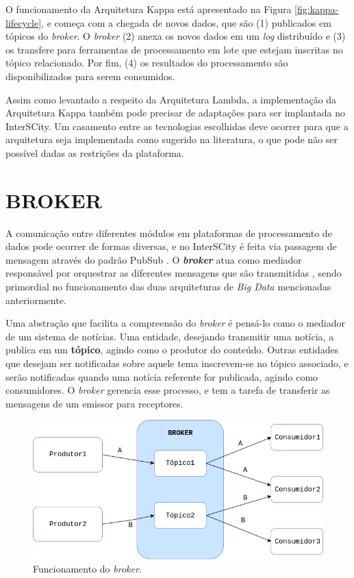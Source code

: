 O funcionamento da Arquitetura Kappa está apresentado na Figura
\ref{fig:kappa-lifecycle}, e começa com a chegada de novos dados,
que são (1) publicados em tópicos do \textit{broker}. O \textit{broker} (2) anexa
os novos dados em um \textit{log} distribuído e (3) os transfere para
ferramentas de processamento em lote que estejam inscritas no tópico
relacionado. Por fim, (4) os resultados do processamento são disponibilizados
para serem consumidos.

Assim como levantado a respeito da Arquitetura Lambda, a implementação da
Arquitetura Kappa também pode precisar de adaptações para ser implantada no
InterSCity. Um casamento entre as tecnologias escolhidas deve ocorrer para que a
arquitetura seja implementada como sugerido na literatura, o que pode não ser
possível dadas as restrições da plataforma.

\section{BROKER}

A comunicação entre diferentes módulos em plataformas de processamento de dados
pode ocorrer de formas diversas, e no InterSCity é feita via passagem de
mensagem através do padrão PubSub \cite{delesposte2017}.
O \textbf{\textit{broker}} atua como mediador responsável por orquestrar as diferentes
mensagens que são transmitidas \cite{marz2015}, sendo primordial no
funcionamento das duas arquiteturas de \textit{Big Data} mencionadas anteriormente.

Uma abstração que facilita a compreensão do \textit{broker} é pensá-lo como o
mediador de um sistema de notícias. Uma entidade, desejando transmitir
uma notícia, a publica em um \textbf{tópico}, agindo como o produtor do
conteúdo. Outras entidades que desejam ser notificadas sobre aquele tema
inscrevem-se no tópico associado, e serão notificadas quando uma notícia referente
for publicada, agindo como consumidores. O \textit{broker} gerencia esse
processo, e tem a tarefa de transferir as mensagens de um emissor para
receptores.

\begin{figure}[hbt]
  \centering
    \includegraphics[scale=0.5]{figuras/broker.png}
    \caption{Funcionamento do \textit{broker}.}
  \label{fig:broker}
\end{figure}

